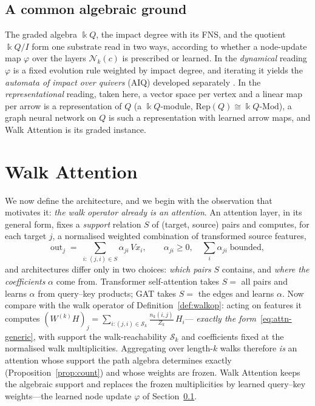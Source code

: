 \documentclass[runningheads]{llncs}
\newcommand{\kk}{\Bbbk}
\newcommand{\kQ}{\kk Q}
\begin{document}
\subsection{A common algebraic ground}\label{sec:ground}

The graded algebra $\kQ$, the impact degree with its FNS, and the quotient
$\kQ/I$ form one substrate read in two ways, according to whether a node-update
map $\varphi$ over the layers $\mathcal{N}_k(c)$ is prescribed or learned. In
the \emph{dynamical} reading $\varphi$ is a fixed evolution rule weighted by
impact degree, and iterating it yields the \emph{automata of impact over
quivers} (AIQ) developed separately
\cite{zainea2026aiq,ibanez2025casimulations}. In the \emph{representational}
reading, taken here, a vector space per vertex and a linear map per arrow is a
representation of $Q$ (a $\kQ$-module,
$\mathrm{Rep}(Q)\cong\kQ\text{-}\mathrm{Mod}$), a graph neural network on $Q$
is such a representation with learned arrow maps, and Walk Attention is its
graded instance.

\section{Walk Attention}\label{sec:model}

We now define the architecture, and we begin with the observation that
motivates it: \emph{the walk operator already is an attention}. An attention
layer, in its general form, fixes a \emph{support} relation $S$ of (target,
source) pairs and computes, for each target $j$, a normalised weighted
combination of transformed source features,
\begin{equation}\label{eq:attn-generic}
  \mathrm{out}_j \;=\; \sum_{i:\,(j,i)\in S}\alpha_{ji}\,Vx_i,
  \qquad \alpha_{ji}\ge0,\quad \textstyle\sum_{i}\alpha_{ji}\;\text{bounded},
\end{equation}
and architectures differ only in two choices: \emph{which pairs} $S$ contains,
and \emph{where the coefficients} $\alpha$ come from. Transformer
self-attention \cite{vaswani2017attention} takes $S=$ all pairs and learns
$\alpha$ from query--key products; GAT \cite{velickovic2017graph} takes $S=$
the edges and learns $\alpha$. Now compare with the walk operator of
Definition~\ref{def:walkop}: acting on features it computes
$(W^{(k)}H)_j=\sum_{i:(j,i)\in\mathcal{S}_k}\tfrac{n_k(i,j)}{Z_k}\,H_i$---
\emph{exactly the form}~\eqref{eq:attn-generic}, with support the
walk-reachability $\mathcal{S}_k$ and coefficients fixed at the normalised walk
multiplicities. Aggregating over length-$k$ walks therefore \emph{is} an
attention whose support the path algebra determines exactly
(Proposition~\ref{prop:count}) and whose weights are frozen. Walk Attention
keeps the algebraic support and replaces the frozen multiplicities by learned
query--key weights---the learned node update $\varphi$ of
Section~\ref{sec:ground}.
\end{document}
